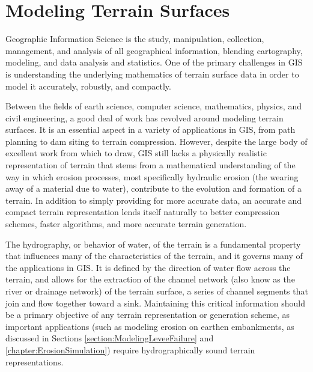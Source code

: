 \section{Modeling Terrain Surfaces}
\label{section:ModelingTerrainSurfaces}

Geographic Information Science is the study, manipulation, collection, management, and analysis of all geographical information, 
blending cartography, modeling, and data analysis and statistics.
One of the primary challenges in GIS is understanding the underlying mathematics of terrain surface data in order to model it accurately, robustly, and compactly.

Between the fields of earth science, computer science, mathematics, physics, and civil engineering, a good deal of work has revolved around modeling terrain surfaces. It is an essential aspect in a variety of applications in GIS, from path planning to dam siting to terrain compression. However, despite the large body of excellent work from which to draw, GIS still lacks a physically realistic representation of terrain that stems from a 
mathematical understanding of the way in which erosion processes, most specifically hydraulic erosion (the wearing away of a material due to water), contribute to the evolution and formation of a terrain. 
In addition to simply providing for more accurate data, an accurate and compact terrain representation lends itself naturally to better compression schemes, faster algorithms, and more accurate terrain generation. 


The hydrography, or behavior of water, of the terrain is a fundamental property that influences many of the characteristics of the terrain,
and it governs many of the applications in GIS. 
It is defined by the direction of water flow across the terrain, and allows for the extraction of the channel network (also know as the river or drainage network) of the terrain surface, 
a series of channel segments that join and flow together toward a sink.
Maintaining this critical information should be a primary objective of any terrain representation or generation scheme,
as important applications (such as modeling erosion on earthen embankments, as discussed in Sections \ref{section:ModelingLeveeFailure} and \ref{chapter:ErosionSimulation}) require hydrographically sound terrain representations.


